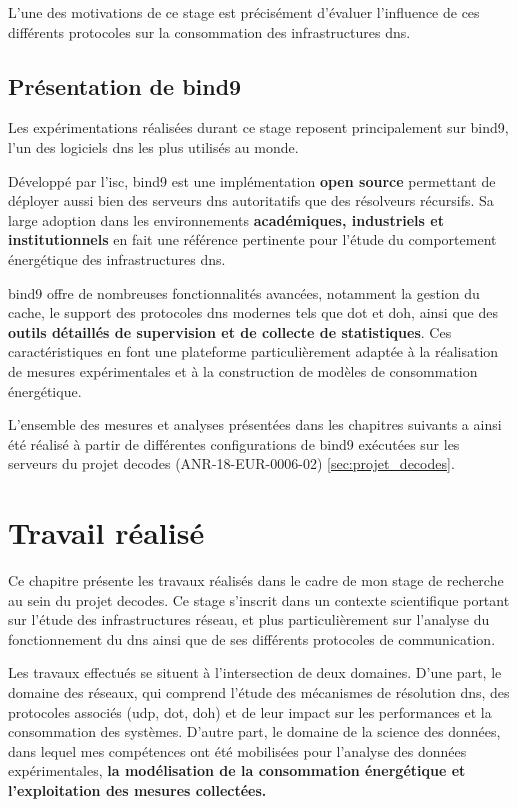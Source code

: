 \documentclass[12pt, a4paper]{report}
\begin{document}
	L'une des motivations de ce stage est précisément d'évaluer l'influence de ces différents protocoles sur la consommation des infrastructures \gls{dns}.

	\section{Présentation de \gls{bind9}}

	Les expérimentations réalisées durant ce stage reposent principalement sur \gls{bind9}, l'un des logiciels \gls{dns} les plus utilisés au monde.

	Développé par l'\gls{isc}, \gls{bind9} est une implémentation \textbf{open source} permettant de déployer aussi bien des serveurs \gls{dns} autoritatifs que des résolveurs récursifs. Sa large adoption dans les environnements \textbf{académiques, industriels et institutionnels} en fait une référence pertinente pour l'étude du comportement énergétique des infrastructures \gls{dns}.

	\gls{bind9} offre de nombreuses fonctionnalités avancées, notamment la gestion du cache, le support des protocoles \gls{dns} modernes tels que \gls{dot} et \gls{doh}, ainsi que des \textbf{outils détaillés de supervision et de collecte de statistiques}. Ces caractéristiques en font une plateforme particulièrement adaptée à la réalisation de mesures expérimentales et à la construction de modèles de consommation énergétique.

	L'ensemble des mesures et analyses présentées dans les chapitres suivants a ainsi été réalisé à partir de différentes configurations de \gls{bind9} exécutées sur les serveurs du projet \gls{decodes} (ANR-18-EUR-0006-02) \ref{sec:projet_decodes}.

	\chapter{Travail réalisé}

	Ce chapitre présente les travaux réalisés dans le cadre de mon stage de recherche au sein du projet \gls{decodes}. Ce stage s'inscrit dans un contexte scientifique portant sur l'étude des infrastructures réseau, et plus particulièrement sur l'analyse du fonctionnement du \gls{dns} ainsi que de ses différents protocoles de communication.

	Les travaux effectués se situent à l'intersection de deux domaines. D'une part, le domaine des réseaux, qui comprend l'étude des mécanismes de résolution \gls{dns}, des protocoles associés (\gls{udp}, \gls{dot}, \gls{doh}) et de leur impact sur les performances et la consommation des systèmes. D'autre part, le domaine de la science des données, dans lequel mes compétences ont été mobilisées pour l'analyse des données expérimentales, \textbf{la modélisation de la consommation énergétique et l'exploitation des mesures collectées.}
\end{document}
